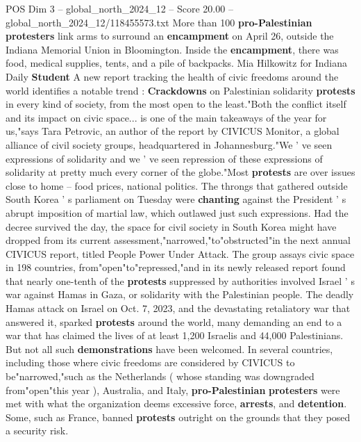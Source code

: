 \begin{textsample}{POS Dim 3 – global\_north\_2024\_12 – Score 20.00 – global\_north\_2024\_12/118455573.txt}  \label{ex:f3_pos_231}
More than 100 \textbf{pro-Palestinian} \textbf{protesters} link arms to surround an \textbf{encampment} on April 26, outside the Indiana Memorial Union in Bloomington.
Inside the \textbf{encampment}, there was food, medical supplies, tents, and a pile of backpacks.
Mia Hilkowitz for Indiana Daily \textbf{Student} A new report tracking the health of civic freedoms around the world identifies a notable trend : \textbf{Crackdowns} on Palestinian solidarity \textbf{protests} in every kind of society, from the most open to the least."Both the conflict itself and its impact on civic space... is one of the main takeaways of the year for us,"says Tara Petrovic, an author of the report by CIVICUS Monitor, a global alliance of civil society groups, headquartered in Johannesburg."We ' ve seen expressions of solidarity and we ' ve seen repression of these expressions of solidarity at pretty much every corner of the globe."Most \textbf{protests} are over issues close to home -- food prices, national politics.
The throngs that gathered outside South Korea ' s parliament on Tuesday were \textbf{chanting} against the President ' s abrupt imposition of martial law, which outlawed just such expressions.
Had the decree survived the day, the space for civil society in South Korea might have dropped from its current assessment,"narrowed,"to"obstructed"in the next annual CIVICUS report, titled People Power Under Attack.
The group assays civic space in 198 countries, from"open"to"repressed,"and in its newly released report found that nearly one-tenth of the \textbf{protests} suppressed by authorities involved Israel ' s war against Hamas in Gaza, or solidarity with the Palestinian people.
The deadly Hamas attack on Israel on Oct. 7, 2023, and the devastating retaliatory war that answered it, sparked \textbf{protests} around the world, many demanding an end to a war that has claimed the lives of at least 1,200 Israelis and 44,000 Palestinians.
But not all such \textbf{demonstrations} have been welcomed.
In several countries, including those where civic freedoms are considered by CIVICUS to be"narrowed,"such as the Netherlands ( whose standing was downgraded from"open"this year ), Australia, and Italy, \textbf{pro-Palestinian} \textbf{protesters} were met with what the organization deems excessive force, \textbf{arrests}, and \textbf{detention}.
Some, such as France, banned \textbf{protests} outright on the grounds that they posed a security risk.

\end{textsample}
